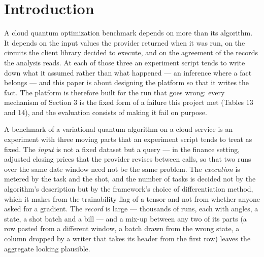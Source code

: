\documentclass[acmsmall,screen,review]{acmart}
\begin{document}
\section{Introduction}

A cloud quantum optimization benchmark depends on more than its algorithm. It depends on the input values the provider returned when it was run, on the circuits the client library decided to execute, and on the agreement of the records the analysis reads. At each of those three an experiment script tends to write down what it assumed rather than what happened --- an inference where a fact belongs --- and this paper is about designing the platform so that it writes the fact. The platform is therefore built for the run that goes wrong: every mechanism of Section 3 is the fixed form of a failure this project met (Tables 13 and 14), and the evaluation consists of making it fail on purpose.


A benchmark of a variational quantum algorithm on a cloud service is an experiment with three moving parts that an experiment script tends to treat as fixed. The \textit{input} is not a fixed dataset but a query --- in the finance setting, adjusted closing prices that the provider revises between calls, so that two runs over the same date window need not be the same problem. The \textit{execution} is metered by the task and the shot, and the number of tasks is decided not by the algorithm's description but by the framework's choice of differentiation method, which it makes from the trainability flag of a tensor and not from whether anyone asked for a gradient. The \textit{record} is large --- thousands of runs, each with angles, a state, a shot batch and a bill --- and a mix-up between any two of its parts (a row pasted from a different window, a batch drawn from the wrong state, a column dropped by a writer that takes its header from the first row) leaves the aggregate looking plausible.
\end{document}
